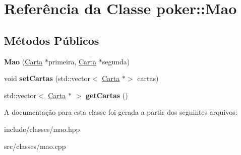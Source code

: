 \hypertarget{classpoker_1_1Mao}{}\section{Referência da Classe poker\+:\+:Mao}
\label{classpoker_1_1Mao}
\subsection*{Métodos Públicos}
\begin{DoxyCompactItemize}
\item 
\mbox{\label{classpoker_1_1Mao_a9b2aded0bf201fc5a7372f024747e918}} 
{\bfseries Mao} (\hyperlink{classpoker_1_1Carta}{Carta} $\ast$primeira, \hyperlink{classpoker_1_1Carta}{Carta} $\ast$segunda)
\item 
\mbox{\label{classpoker_1_1Mao_a26bcbe24d781cc06f118409c5597b22f}} 
void {\bfseries set\+Cartas} (std\+::vector$<$ \hyperlink{classpoker_1_1Carta}{Carta} $\ast$$>$ cartas)
\item 
\mbox{\label{classpoker_1_1Mao_a304c0e5eec24bdeffa00a29fb0f3b3ba}} 
std\+::vector$<$ \hyperlink{classpoker_1_1Carta}{Carta} $\ast$ $>$ {\bfseries get\+Cartas} ()
\end{DoxyCompactItemize}


A documentação para esta classe foi gerada a partir dos seguintes arquivos\+:\begin{DoxyCompactItemize}
\item 
include/classes/mao.\+hpp\item 
src/classes/mao.\+cpp\end{DoxyCompactItemize}
